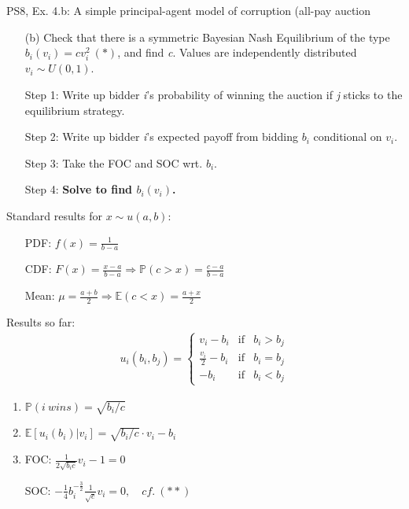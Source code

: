 \begin{frame}{PS8, Ex. 4.b: A simple principal-agent model of corruption (all-pay auction}
    \begin{itemize}
      \item[(b)] Check that there is a symmetric Bayesian Nash Equilibrium of the type $b_i(v_i) = cv_i^2\ (*)$, and find \textit{c}. Values are independently distributed $v_i\sim U(0, 1)$.
    \end{itemize} \vspace{-8pt}
    \begin{multicols}{2}
      \begin{itemize}
        \item[Step 1:] Write up bidder \textit{i}'s probability of winning the auction if \textit{j} sticks to the equilibrium strategy.
        \item[Step 2:] Write up bidder \textit{i}'s expected payoff from bidding $b_i$ conditional on $v_i$.
        \item[Step 3:] Take the FOC and SOC wrt. $b_i$.
        \item[Step 4:] \textbf{Solve to find $b_i(v_i)$.}
      \end{itemize} \vspace{-8pt}
      \vfill\null\columnbreak
      Standard results for $x\sim u(a, b):$ \vspace{-6pt}
      \begin{itemize}
        \item[PDF:] $f(x)=\frac{1}{b-a}$
        \item[CDF:] $F(x)=\frac{x-a}{b-a}\Rightarrow\mathbb{P}(c>x)=\frac{c-a}{b-a}$
        \item[Mean:] $\mu=\frac{a+b}{2}\Rightarrow\mathbb{E}(c<x)=\frac{a+x}{2}$
      \end{itemize}
      \vspace{-6pt}
      Results so far: \vspace{-6pt}
      \begin{align*}
        u_i(b_i,b_j)=\left\{\begin{array}{lcl}
          v_i-b_i           & \text{if} & b_i>b_j \\
          \frac{v_i}{2}-b_i & \text{if} & b_i=b_j \\
          -b_i              & \text{if} & b_i<b_j
        \end{array}\right.
      \end{align*} \vspace{-16pt}
      \begin{enumerate}
        \item $\mathbb{P}(i\ wins)=\sqrt{b_i/c}$
        \item $\mathbb{E}[u_i(b_i)|v_i]=\sqrt{b_i/c}\cdot v_i-b_i$
        \item FOC: $\frac{1}{2\sqrt{b_ic}}v_i-1=0$
        \item[] SOC: $-\frac{1}{4}b_i^{-\frac{3}{2}}\frac{1}{\sqrt{c}}v_i=0,\quad cf.\ (**)$
      \end{enumerate}
      \vfill\null
    \end{multicols}
\end{frame}

